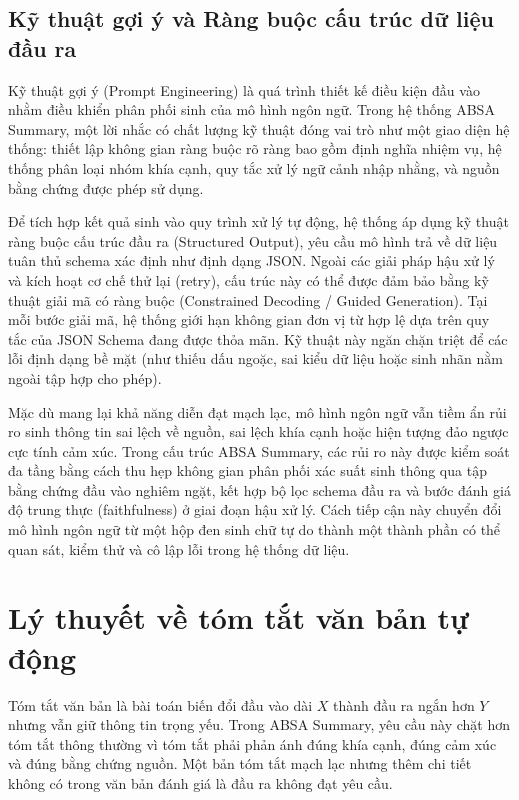 \subsection{Kỹ thuật gợi ý và Ràng buộc cấu trúc dữ liệu đầu ra}
\label{subsec:dev-chap2-prompt-structured-output}

Kỹ thuật gợi ý (Prompt Engineering) là quá trình thiết kế điều kiện đầu vào nhằm điều khiển phân phối sinh của mô hình ngôn ngữ. Trong hệ thống ABSA Summary, một lời nhắc có chất lượng kỹ thuật đóng vai trò như một giao diện hệ thống: thiết lập không gian ràng buộc rõ ràng bao gồm định nghĩa nhiệm vụ, hệ thống phân loại nhóm khía cạnh, quy tắc xử lý ngữ cảnh nhập nhằng, và nguồn bằng chứng được phép sử dụng.

Để tích hợp kết quả sinh vào quy trình xử lý tự động, hệ thống áp dụng kỹ thuật ràng buộc cấu trúc đầu ra (Structured Output), yêu cầu mô hình trả về dữ liệu tuân thủ schema xác định như định dạng JSON. Ngoài các giải pháp hậu xử lý và kích hoạt cơ chế thử lại (retry), cấu trúc này có thể được đảm bảo bằng kỹ thuật giải mã có ràng buộc (Constrained Decoding / Guided Generation). Tại mỗi bước giải mã, hệ thống giới hạn không gian đơn vị từ hợp lệ dựa trên quy tắc của JSON Schema đang được thỏa mãn. Kỹ thuật này ngăn chặn triệt để các lỗi định dạng bề mặt (như thiếu dấu ngoặc, sai kiểu dữ liệu hoặc sinh nhãn nằm ngoài tập hợp cho phép).

Mặc dù mang lại khả năng diễn đạt mạch lạc, mô hình ngôn ngữ vẫn tiềm ẩn rủi ro sinh thông tin sai lệch về nguồn, sai lệch khía cạnh hoặc hiện tượng đảo ngược cực tính cảm xúc. Trong cấu trúc ABSA Summary, các rủi ro này được kiểm soát đa tầng bằng cách thu hẹp không gian phân phối xác suất sinh thông qua tập bằng chứng đầu vào nghiêm ngặt, kết hợp bộ lọc schema đầu ra và bước đánh giá độ trung thực (faithfulness) ở giai đoạn hậu xử lý. Cách tiếp cận này chuyển đổi mô hình ngôn ngữ từ một hộp đen sinh chữ tự do thành một thành phần có thể quan sát, kiểm thử và cô lập lỗi trong hệ thống dữ liệu.
\section{Lý thuyết về tóm tắt văn bản tự động}
\label{sec:dev-chap2-summarization}

Tóm tắt văn bản là bài toán biến đổi đầu vào dài $X$ thành đầu ra ngắn hơn $Y$ nhưng vẫn giữ thông tin trọng yếu. Trong ABSA Summary, yêu cầu này chặt hơn tóm tắt thông thường vì tóm tắt phải phản ánh đúng khía cạnh, đúng cảm xúc và đúng bằng chứng nguồn. Một bản tóm tắt mạch lạc nhưng thêm chi tiết không có trong văn bản đánh giá là đầu ra không đạt yêu cầu.

